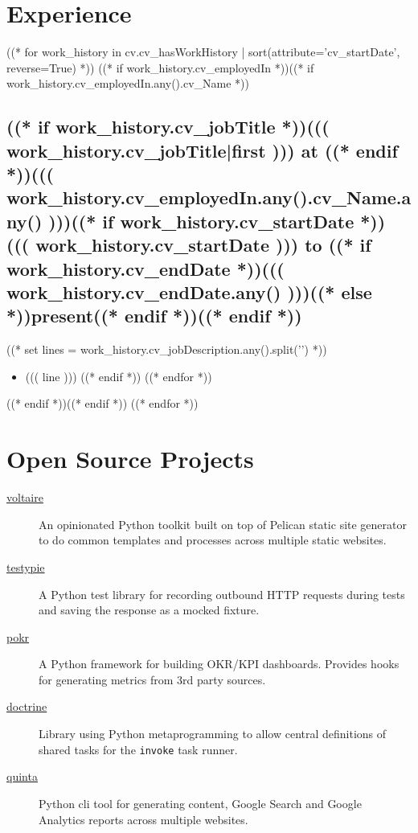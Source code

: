 \documentclass[10pt]{article}
\begin{document}
\section*{Experience}
((* for work_history in cv.cv_hasWorkHistory | sort(attribute='cv_startDate', reverse=True) *))
((* if work_history.cv_employedIn *))((* if work_history.cv_employedIn.any().cv_Name *))
\subsection*{((* if work_history.cv_jobTitle *))((( work_history.cv_jobTitle|first ))) at ((* endif *))((( work_history.cv_employedIn.any().cv_Name.any() )))((* if work_history.cv_startDate *)) \hfill ((( work_history.cv_startDate ))) to ((* if work_history.cv_endDate *))((( work_history.cv_endDate.any() )))((* else *))present((* endif *))((* endif *))}
((* set lines = work_history.cv_jobDescription.any().split('\n\n') *))
\begin{itemize}
((* for line in lines *))
((* if line *))
    \item ((( line )))
((* endif *))
((* endfor *))
\end{itemize}
((* endif *))((* endif *))
((* endfor *))

\section*{Open Source Projects}
\begin{description}
    \item[\href{https://github.com/avengerpenguin/voltaire}{voltaire}] An opinionated Python toolkit built on top of Pelican static site generator to do common templates and processes across multiple static websites.
    \item[\href{https://github.com/avengerpenguin/testypie}{testypie}] A Python test library for recording outbound HTTP requests during tests and saving the response as a mocked fixture.
    \item[\href{https://github.com/avengerpenguin/pokr}{pokr}] A Python framework for building OKR/KPI dashboards. Provides hooks for generating metrics from 3rd party sources.
    \item[\href{https://github.com/avengerpenguin/doctrine}{doctrine}] Library using Python metaprogramming to allow central definitions of shared tasks for the \texttt{invoke} task runner.
    \item[\href{https://github.com/avengerpenguin/quinta}{quinta}] Python cli tool for generating content, Google Search and Google Analytics reports across multiple websites.
\end{description}
\end{document}
